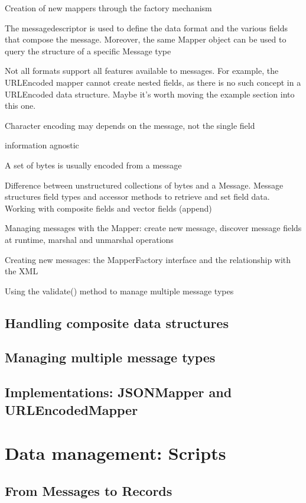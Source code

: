 Creation of new mappers through the factory mechanism

The messagedescriptor is used to define the data format and the various fields
that compose the message. Moreover, the same Mapper object can be used to query
the structure of a specific Message type

Not all formats support all features available to messages. For example, the
URLEncoded mapper cannot create nested fields, as there is no such concept in a
URLEncoded data structure. Maybe it's worth moving the example section into
this one.

Character encoding may depends on the message, not the single field

information agnostic

A set of bytes is usually encoded from a message

Difference between unstructured collections of bytes and a Message.
Message structures field types and accessor methods to retrieve and set field
data. Working with composite fields and vector fields (append)

Managing messages with the Mapper: create new message, discover message
fields at runtime, marshal and unmarshal operations

Creating new messages: the MapperFactory interface and the relationship with
the XML


Using the validate() method to manage multiple message types



\subsection{Handling composite data structures}

\subsection{Managing multiple message types}

\subsection{Implementations: JSONMapper and URLEncodedMapper}


\section{Data management: Scripts}
\label{sec:components.script}

\subsection{From Messages to Records}

